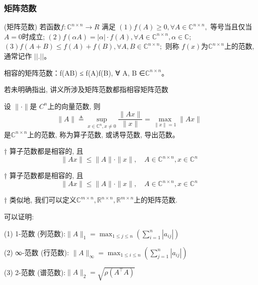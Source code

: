 \documentclass[12pt,a4paper]{article}
\begin{document}
\subsubsection{矩阵范数}
\begin{framed}
	\begin{definition}(矩阵范数)
		若函数$f : \mathbb{C}^{n×n} → R$ 满足
		$(1) f(A) ≥ 0, ∀ A ∈ \mathbb{C}^{n×n},$ 等号当且仅当 $A = 0$时成立;
		$(2) f(αA) = |α| · f(A), ∀ A ∈ \mathbb{C}^{n×n}, α ∈ \mathbb{C};$
		$(3) f(A + B) ≤ f(A) + f(B), ∀A, B ∈ \mathbb{C}^{n×n};$
		则称 $f(x) $为$\mathbb{C}
		^{n×n} $上的范数, 通常记作 $||.||$。
	\end{definition}
\end{framed}

相容的矩阵范数：f(AB) ≤ f(A)f(B), ∀ A, B ∈$\mathbb{C}^{n×n}$。

\begin{framed}
	若未明确指出, 讲义所涉及矩阵范数都指相容矩阵范数
\end{framed}

\begin{framed}
	\begin{lemma}
		设 $∥ · ∥ $是 $C^{n}$上的向量范数, 则
		$$
		\|A\| \triangleq \sup _{x \in \mathbb{C}^{n}, x \neq 0} \frac{\|A x\|}{\|x\|}=\max _{\|x\|=1}\|A x\|
		$$
		是$\mathbb{C}
		^{n×n} $上的范数, 称为算子范数, 或诱导范数, 导出范数。
	\end{lemma}
\end{framed}

\begin{framed}
† 算子范数都是相容的, 且$$ \|A x\| \leq\|A\| \cdot\|x\|, \quad A \in \mathbb{C}^{n \times n}, x \in \mathbb{C}^{n}$$
\end{framed}

\begin{framed}
	† 算子范数都是相容的, 且$$ \|A x\| \leq\|A\| \cdot\|x\|, \quad A \in \mathbb{C}^{n \times n}, x \in \mathbb{C}^{n}$$
\end{framed}

\begin{framed}
† 类似地, 我们可以定义$\mathbb{C}^{m \times n}, \mathbb{R}^{n \times n}, \mathbb{R}^{m \times n}$上的矩阵范数.
\end{framed}

\begin{framed}
	\begin{lemma}
		可以证明:
		
		(1) 1-范数 (列范数):$\|A\|_{1}=\max _{1 \leq j \leq n}\left(\sum_{i=1}^{n}\left|a_{i j}\right|\right)$
		
		(2) ∞-范数 (行范数): $\|A\|_{\infty}=\max _{1 \leq i \leq n}\left(\sum_{j=1}^{n}\left|a_{i j}\right|\right)$
		
		(3) 2-范数 (谱范数):$\|A\|_{2}=\sqrt{\rho\left(A^{\top} A\right)}$
		
	\end{lemma}
\end{framed}
\end{document}

